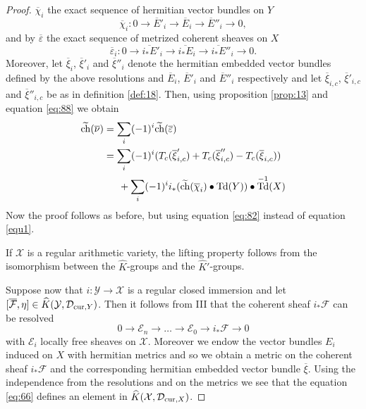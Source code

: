 \documentclass[10pt,twoside]{article}
\numberwithin{equation}{section}
\theoremstyle{plain}
\theoremstyle{definition}
\DeclareMathOperator{\Td}{Td}
\DeclareMathOperator{\ch}{ch}
\newcommand{\D}{\text{{\rm cur}}}
\begin{document}
\begin{proof}
$\overline {\chi}_{i}$ the exact sequence of hermitian vector bundles
on $Y$
\begin{displaymath}
  \overline {\chi}_{i}\colon  0\longrightarrow \overline E'_{i}
  \longrightarrow \overline E_{i}
  \longrightarrow \overline E''_{i}
  \longrightarrow 0,
\end{displaymath}
and by $\overline \varepsilon $ the exact sequence of metrized
coherent sheaves on $X$
\begin{displaymath}
  \overline {\varepsilon }_{i}\colon  0\longrightarrow \overline
  {i_{\ast}E}'_{i} 
  \longrightarrow \overline {i_{\ast} E}_{i}
  \longrightarrow \overline {i_{\ast}E}''_{i}
  \longrightarrow 0.
\end{displaymath}
Moreover, let $\overline {\xi}_{i}$, $\overline {\xi}'_{i}$ and
$\overline {\xi}''_{i}$ denote the 
hermitian embedded 
vector bundles defined by the above resolutions and $\overline E_{i}$,
$\overline E'_{i}$ and 
$\overline E''_{i}$ respectively and let  $\overline {\xi}_{i,c}$,
$\overline {\xi}'_{i,c}$ and 
$\overline {\xi}''_{i,c}$ be as in definition \ref{def:18}.  
Then, using proposition \ref{prop:13} and equation \eqref{eq:88}
we obtain 
\begin{align}
  \widetilde{\ch}(\overline {\nu })&=\sum_{i}(-1)^{i}\widetilde{\ch} 
  (\overline {\varepsilon })\notag\\
  &=\sum_{i}(-1)^{i}(T_{c}(\overline {\xi}'_{i,c})+
  T_{c}(\overline {\xi}''_{i,c})-
  T_{c}(\overline {\xi}_{i,c}))\label{eq:82}\\  
  &\phantom{AA}+\sum_{i}(-1)^{i}i_{\ast}(\widetilde{\ch}
  (\overline{\chi}_{i})\bullet \Td(Y))\bullet \Td^{-1}(X)\notag  
\end{align}
Now the proof follows as before, but using equation \eqref{eq:82}
instead of equation \eqref{equ1}. 

If $\mathcal{X}$ is a regular arithmetic variety, the lifting
property follows from the isomorphism between the $\widehat K$-groups
and the 
$\widehat K'$-groups.

Suppose now that  $i\colon \mathcal{Y}\longrightarrow \mathcal{X}$ is a
regular closed immersion and let $[\overline{\mathcal{F}},\eta]\in
\widehat K(\mathcal{Y},\mathcal{D}_{\D,Y})$. Then it follows from
\cite{BerthelotGrothendieck:SGA6} III that the
coherent sheaf  
$i_{\ast}\mathcal{F}$ can be resolved
\begin{displaymath}
0\longrightarrow \mathcal{E}_n\longrightarrow\ldots\longrightarrow
\mathcal{E}_0\longrightarrow i_{\ast}\mathcal{F}\longrightarrow 0
\end{displaymath}
with $\mathcal{E}_i$ locally free sheaves on $\mathcal{X}$. Moreover
we endow the 
vector bundles $E_i$ induced on $X$ with hermitian metrics and so
we obtain a metric on the coherent sheaf $i_{\ast}\mathcal{F}$ and the
corresponding hermitian embedded vector bundle $\overline{\xi}$.
Using the independence from the resolutions and on the metrics we see
that the equation \ref{eq:66} defines an element in
$\widehat K(\mathcal{X},\mathcal{D}_{\D,X})$.
\end{proof}
\end{document}
